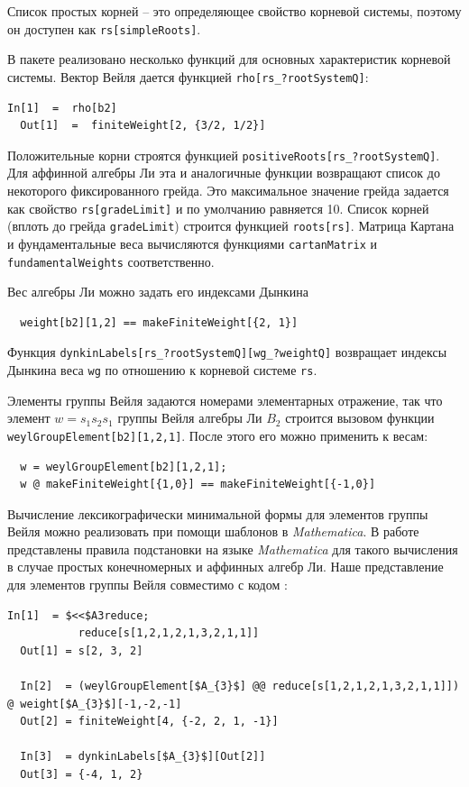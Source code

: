 Список простых корней -- это определяющее свойство корневой системы, поэтому он доступен как \lstinline{rs[simpleRoots]}.

В пакете реализовано несколько функций для основных характеристик корневой системы. Вектор Вейля дается функцией
\lstinline{rho[rs_?rootSystemQ]}:
\begin{lstlisting}[label=list:1]
  In[1]  =  rho[b2]
  Out[1]  =  finiteWeight[2, {3/2, 1/2}]
\end{lstlisting}
Положительные корни строятся функцией  \lstinline{positiveRoots[rs_?rootSystemQ]}. Для аффинной алгебры Ли эта и аналогичные функции возвращают список до некоторого фиксированного грейда. Это максимальное значение грейда задается как свойство \lstinline{rs[gradeLimit]} и по умолчанию равняется 10. Список корней  (вплоть до грейда \lstinline{gradeLimit}) строится функцией \lstinline{roots[rs]}. Матрица Картана и фундаментальные веса вычисляются функциями \lstinline{cartanMatrix} и \lstinline{fundamentalWeights} соответственно.

Вес алгебры Ли можно задать его индексами Дынкина
\begin{lstlisting}
  weight[b2][1,2] == makeFiniteWeight[{2, 1}]
\end{lstlisting}
Функция \lstinline{dynkinLabels[rs_?rootSystemQ][wg_?weightQ]} возвращает индексы Дынкина веса \lstinline{wg} по отношению к корневой системе \lstinline{rs}.

Элементы группы Вейля задаются номерами элементарных отражение, так что элемент  $w=s_{1}s_{2}s_{1}$ группы Вейля алгебры Ли $B_{2}$ строится вызовом функции \lstinline{weylGroupElement[b2][1,2,1]}. После этого его можно применить к весам:
\begin{lstlisting}
  w = weylGroupElement[b2][1,2,1];
  w @ makeFiniteWeight[{1,0}] == makeFiniteWeight[{-1,0}]
\end{lstlisting}

Вычисление лексикографически минимальной формы \cite{casselman1994machine,casselman1995automata} для элементов группы Вейля можно реализовать при помощи шаблонов в  {\it Mathematica}. В работе \cite{KallenShortlex} представлены правила подстановки на языке {\it Mathematica} для такого вычисления в случае простых конечномерных и аффинных алгебр Ли. Наше представление для элементов группы Вейля совместимо с кодом \cite{KallenShortlex}:
\begin{lstlisting}[mathescape=true]
  In[1]  = $<<$A3reduce;
           reduce[s[1,2,1,2,1,3,2,1,1]]
  Out[1] = s[2, 3, 2]

  In[2]  = (weylGroupElement[$A_{3}$] @@ reduce[s[1,2,1,2,1,3,2,1,1]]) @ weight[$A_{3}$][-1,-2,-1]
  Out[2] = finiteWeight[4, {-2, 2, 1, -1}]

  In[3]  = dynkinLabels[$A_{3}$][Out[2]]
  Out[3] = {-4, 1, 2}
\end{lstlisting}

